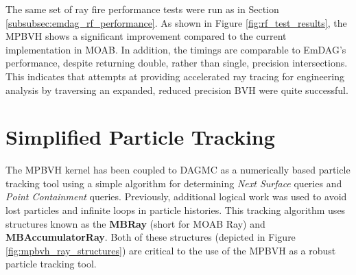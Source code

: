 The same set of ray fire performance tests were run as in Section
\ref{subsubsec:emdag_rf_performance}. As shown in Figure
\ref{fig:rf_test_results}, the MPBVH shows a significant improvement compared to
the current implementation in MOAB. In addition, the timings are comparable to
EmDAG's performance, despite returning double, rather than single, precision
intersections. This indicates that attempts at providing accelerated ray tracing
for engineering analysis by traversing an expanded, reduced precision BVH were
quite successful.

\section{Simplified Particle Tracking}\label{sec:simplified_particle_tracking}

The MPBVH kernel has been coupled to DAGMC as a numerically based particle
tracking tool using a simple algorithm for determining \textit{Next Surface}
queries and \textit{Point Containment} queries. Previously, additional logical
work was used to avoid lost particles and infinite loops in particle
histories. This tracking algorithm uses structures known as the \textbf{MBRay}
(short for MOAB Ray) and \textbf{MBAccumulatorRay}. Both of these structures
(depicted in Figure \ref{fig:mpbvh_ray_structures}) are critical to the use of the
MPBVH as a robust particle tracking tool.


